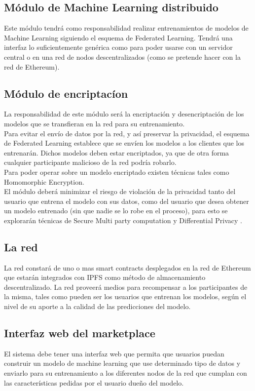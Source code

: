 \documentclass[
11pt, %
oneside, %
spanish, %
singlespacing, %
parskip, %
headsepline, %
chapterinoneline, %
]{MastersDoctoralThesis} %
\begin{document}
\subsection*{Módulo de Machine Learning distribuido}
Este módulo tendrá como responsabilidad realizar entrenamientos de modelos de Machine Learning siguiendo el esquema de Federated Learning. Tendrá una interfaz lo suficientemente genérica como para poder usarse con un servidor central o en una red de nodos descentralizados (como se pretende hacer con la red de Ethereum).

\subsection*{Módulo de encriptac\'ion}
La responsabilidad de este módulo será la encriptación y desencriptación de los modelos que se transfieran en la red para su entrenamiento. \\
Para evitar el envío de datos por la red, y así preservar la privacidad, el esquema de Federated Learning establece que se envíen los modelos a los clientes que los entrenarán.
Dichos modelos deben estar encriptados, ya que de otra forma cualquier participante malicioso de la red podría robarlo. \\
Para poder operar sobre un modelo encriptado existen técnicas tales como Homomorphic Encryption. \\
El módulo deberá minimizar el riesgo de violación de la privacidad tanto del usuario que entrena el modelo con sus datos, como del usuario que desea obtener un modelo entrenado (sin que nadie se lo robe en el proceso), para esto se explorarán técnicas de  Secure Multi party computation y Differential Privacy \cite{diffpriv1} \cite{diffpriv2}.

\subsection*{La red}
La red constará de uno o mas smart contracts desplegados en la red de Ethereum que estarán integrados con IPFS como método de almacenamiento descentralizado.
La red proveerá medios para recompensar a los participantes de la misma, tales como pueden ser los usuarios que entrenan los modelos, según el nivel de su aporte a la calidad de las predicciones del modelo.

\subsection*{Interfaz web del marketplace}
El sistema debe tener una interfaz web que permita que usuarios puedan construir un modelo de machine learning que use determinado tipo de datos y enviarlo para su entrenamiento a los diferentes nodos de la red que cumplan con las características pedidas por el usuario dueño del modelo.
\end{document}
